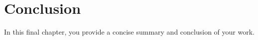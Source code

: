 \chapter{Conclusion}
\label{chap:conclusion}

In this final chapter, you provide a concise summary and conclusion of your work.

